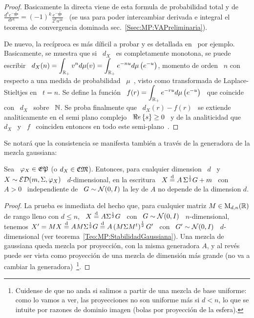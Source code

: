 \begin{proof}
  Basicamente la  directa viene  de esta  formula de probabilidad  total y  de \
  $\displaystyle     \frac{d^k    e^{-\frac{r}{2    a^2}}}{dr^k}     =    (-1)^k
  \frac{e^{-\frac{r}{2 a^2}}}{2^k  a^{2 k}}$ \  (se usa para  poder intercambiar
  derivada    e     integral    el    teorema     de    convergencia    dominada
  sec.~\ref{Ssec:MP:VAPreliminaria}).

  De  nuevo,  la  rec\'iproca  es  m\'as  d\'ificil  a  probar  y  es  detallada
  en~\cite[\S~12]{Wid46} por ejemplo.  Basicamente, se  muestra que si \ $d_X$ \
  es  completamente  monotona,  se  puede  escribir \  $\displaystyle  d_X(n)  =
  \int_{\mathbb{R}_+}  v^n  d\mu(v)  =  \int_{\mathbb{R}_+}  e^{-n  u}  d\mu\left(  e^{-u}
  \right)$, momento de  orden \ $n$ con respecto a una  medida de probabilidad \
  $\mu$~\cite{Hau21:I, Hau21:II},  visto como transformada  de Laplace-Stieltjes
  en \ $t  = n$.  Se define la funci\'on \  $\displaystyle f(r) = \int_{\mathbb{R}_+}
  e^{- r  u} d\mu\left( e^{-u}  \right)$ \  que coincide con  \ $d_X$ \  sobre \
  $\mathbb{N}$.   Se  proba   finalmente  que  \  $d_X(r)  -   f(r)$  \  se  extiende
  analiticamente  en el  semi  plano  complejo \  $\Re e \left\{ s \right\}  \ge 0$  \  y de  la
  analiticidad  que  \ $d_X$  \  y  \ $f$  \  coinciden  entonces  en todo  este
  semi-plano~\cite{Car21, CarKro05}.
\end{proof}

Se  notar\'a  que  la consistencia  se  manifesta  tambi\'en  a trav\'es  de  la
generadora de la mezcla gaussiana:
%
\begin{lema}\label{Lem:MP:AIndependienteD}
  Sea  \ $\varphi_X  \in  \mathfrak{EP}$ (o  $d_X  \in \mathfrak{CM}$).  Entonces, para  cualquier
  dimension \ $d$ \ y  $X \sim \mathcal{ED}(m,\Sigma,\varphi_X)$ \ $d$-dimensional, en la
  escritura  \ $X  \stackrel{\mathrm{d}}{=}  A \,  \Sigma^{\frac12} G  +  m$ \  con  \ $A  > 0$  \
  independiente de \ $G  \sim \mathcal{N}(0,I)$ la ley de $A$ no  depende de la dimension
  $d$.
\end{lema}
%
\begin{proof}
  La  prueba  es  inmediata  del   hecho  que,  para  cualquier  matriz  $M  \in
  \mathrm{M}_{d,n}(\mathbb{R})$ de rango lleno con $d  \le n$, \ $X \stackrel{\mathrm{d}}{=} A \Sigma^{\frac12}
  G $ \ con  \ $G \sim \mathcal{N}(0,I)$ \ $n$-dimensional, tenemos $X' =  M X \stackrel{\mathrm{d}}{=} A M
  \Sigma^{\frac12} G \stackrel{\mathrm{d}}{=} A \left( M  \Sigma M^t \right)^{\frac12} G'$ \ con \
  $G'         \sim        \mathcal{N}(0,I)$         \         $d$-dimensional        (ver
  teorema~\ref{Teo:MP:StabilidadGaussiana}).  Una   mezcla  de  gaussiana  queda
  mezcla por proyecci\'on,  con la misma generadora $A$, y  al rev\'es puede ser
  vista como  proyecci\'on de una  mezcla de dimensi\'on  m\'as grande (no  va a
  cambiar la generadora)~\footnote{Cuidense  de que no anda si  salimos a partir
    de una mezcla de base uniforme: como lo vamos a ver, las proyecciones no son
    uniforme m\'as si $d  < n$, lo que se intuite por  razones de dominio imagen
    (bolas por proyecci\'on de la esfera).}.
\end{proof}

